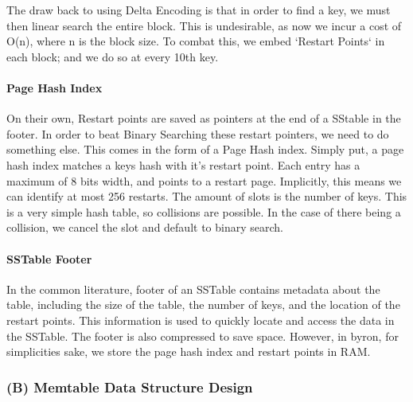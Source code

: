 \documentclass[10pt]{article}
\begin{document}
The draw back to using Delta Encoding is that in order to find a key, we must then linear search the entire block. This is undesirable, as now we incur a cost of O(n), where n is the block size.
To combat this, we embed `Restart Points` in each block; and we do so at every 10th key.


\paragraph{Page Hash Index}

On their own, Restart points are saved as pointers at the end of a SStable in the footer. In order to beat Binary Searching these restart pointers, we need to do something else. This comes in the form of a Page Hash index.
Simply put, a page hash index matches a keys hash with it's restart point. Each entry has a maximum of 8 bits width, and points to a restart page. Implicitly, this means we can identify at most 256 restarts.
The amount of slots is the number of keys. This is a very simple hash table, so collisions are possible. In the case of there being a collision, we cancel the slot and default to binary search.

\paragraph{SSTable Footer}
In the common literature, footer of an SSTable contains metadata about the table, including the size of the table, the number of keys, and the location of the restart points. This information is used to quickly locate and access the data in the SSTable. The footer is also compressed to save space.
However, in byron, for simplicities sake, we store the page hash index and restart points in RAM.



\subsubsection*{(B) Memtable Data Structure Design}
\end{document}
